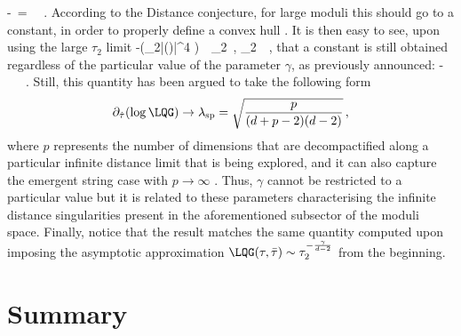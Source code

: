 %
\beq
	-\,  \frac {\partial \LQG}{\partial \hat{\tau}} = \,  \, .
\eeq
%
According to the Distance conjecture, for large moduli this should go to a constant, in order to properly define a convex hull \cite{Etheredge:2022opl, Calderon-Infante:2023ler}. It is then easy to see, upon using the large $\tau_2$ limit
%
\beq \label{eq:larget2limits}
	-\log \left(\tau_2|\eta(\tau)|^4 \right)\, \to \, \tau_2\, , _2\ \to {}\, ,
\eeq
%
that a constant is still obtained regardless of the particular value of the parameter $\gamma$, as previously announced:
%
\beq \label{eq:chargetomassratio}
	-\,  \frac {\partial \LQG}{\partial \hat{\tau}}\, \to\, \, \, .
\eeq
%
Still, this quantity has been argued to take  the following form \cite{Calderon-Infante:2023ler, vandeHeisteeg:2023ubh}
\begin{equation}
\label{eq:lambdaspecies}
\partial_{\hat{\tau}} (\log \LQG) \to \lambda_{\text{sp}}=\sqrt{\frac{p}{(d+p-2)(d-2)}}\, ,  
\end{equation} 
where $p$ represents the number of dimensions that are decompactified along a particular infinite distance limit that is being explored, and it can also capture the emergent string case with $p\to \infty$ . Thus, $\gamma$ cannot be restricted to a particular value but it is related to these parameters characterising the infinite distance singularities present in the aforementioned subsector of the moduli space. Finally, notice that the result matches the same quantity computed upon imposing the asymptotic approximation $\LQG(\tau, \bar \tau) \sim \tau_2^{-\frac{\gamma}{d-2}}$ from the beginning.



\section{Summary}

